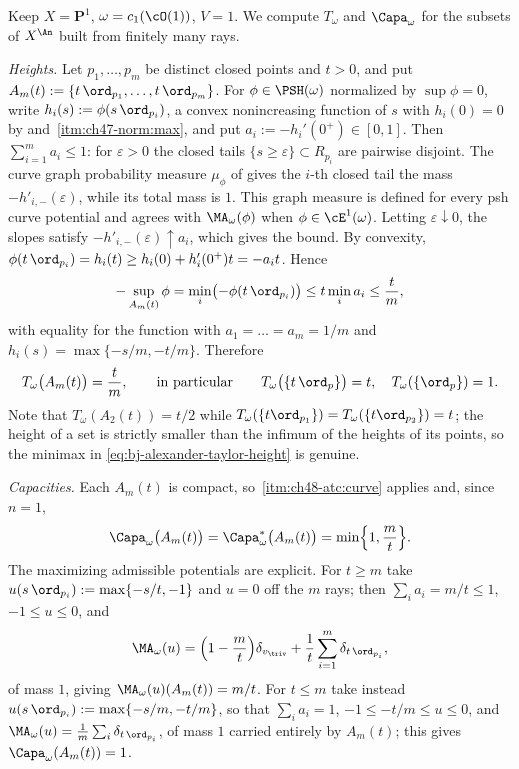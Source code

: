\begin{example}
\label{ex:ch48-p1-capacity}
Keep $X=\mathbf P^1$, $\omega=c_1(\cO(1))$, $V=1$.  We compute
$T_\omega$ and $\Capa_\omega$ for the subsets of $X^{\An}$ built from
finitely many rays.

\emph{Heights.}  Let $p_1,\dots,p_m$ be distinct closed points and
$t>0$, and put $A_m(t):=\{t\,\ord_{p_1},\dots,t\,\ord_{p_m}\}$.  For
$\phi\in\PSH(\omega)$ normalized by $\sup\phi=0$, write
$h_i(s):=\phi(s\,\ord_{p_i})$, a convex nonincreasing function of $s$
with $h_i(0)=0$ by  and
\,\cref{itm:ch47-norm:max}, and put
$a_i:=-h_i'(0^+)\in[0,1]$.  Then $\sum_{i=1}^ma_i\le1$: for
$\varepsilon>0$ the closed tails $\{s\ge\varepsilon\}\subset R_{p_i}$
are pairwise disjoint. The curve graph probability measure
$\mu_\phi$ of \cite[Proposition~7.20]{BJ22} gives the $i$-th
closed tail the mass $-h'_{i,-}(\varepsilon)$, while its total mass
is $1$. This graph measure is defined for every psh curve potential
and agrees with $\MA_\omega(\phi)$ when $\phi\in\cE^1(\omega)$.
Letting $\varepsilon\downarrow0$, the slopes satisfy
$-h'_{i,-}(\varepsilon)\uparrow a_i$, which gives the bound.  By convexity,
$\phi(t\,\ord_{p_i})=h_i(t)\ge h_i(0)+h_i'(0^+)t=-a_it$.  Hence
\[
 -\sup_{A_m(t)}\phi=\min_i\bigl(-\phi(t\,\ord_{p_i})\bigr)
 \le t\min_ia_i\le\frac tm ,
\]
with equality for the function with $a_1=\dots=a_m=1/m$ and
$h_i(s)=\max\{-s/m,-t/m\}$.  Therefore
\[
 T_\omega\bigl(A_m(t)\bigr)=\frac tm,
 \qquad\text{in particular}\qquad
 T_\omega\bigl(\{t\,\ord_p\}\bigr)=t,\quad T_\omega(\{\ord_p\})=1 .
\]
Note that $T_\omega(A_2(t))=t/2$ while
$T_\omega(\{t\ord_{p_1}\})=T_\omega(\{t\ord_{p_2}\})=t$; the height of a
set is strictly smaller than the infimum of the heights of its points, so
the minimax in \eqref{eq:bj-alexander-taylor-height} is genuine.

\emph{Capacities.}  Each $A_m(t)$ is compact, so
\,\cref{itm:ch48-atc:curve} applies and, since
$n=1$,
\[
 \Capa_\omega\bigl(A_m(t)\bigr)
 =\Capa^*_\omega\bigl(A_m(t)\bigr)
 =\min\Bigl\{1,\frac mt\Bigr\} .
\]
The maximizing admissible potentials are explicit.  For $t\ge m$ take
$u(s\,\ord_{p_i}):=\max\{-s/t,-1\}$ and $u=0$ off the $m$ rays; then
$\sum_ia_i=m/t\le1$, $-1\le u\le0$, and
\[
 \MA_\omega(u)=\Bigl(1-\frac mt\Bigr)\delta_{v_{\triv}}
   +\frac1t\sum_{i=1}^m\delta_{t\,\ord_{p_i}},
\]
of mass $1$, giving $\MA_\omega(u)(A_m(t))=m/t$.  For $t\le m$ take
instead $u(s\,\ord_{p_i}):=\max\{-s/m,-t/m\}$, so that
$\sum_ia_i=1$, $-1\le-t/m\le u\le0$, and
$\MA_\omega(u)=\frac1m\sum_i\delta_{t\,\ord_{p_i}}$, of mass $1$
carried entirely by $A_m(t)$; this gives $\Capa_\omega(A_m(t))=1$.


\end{example}
